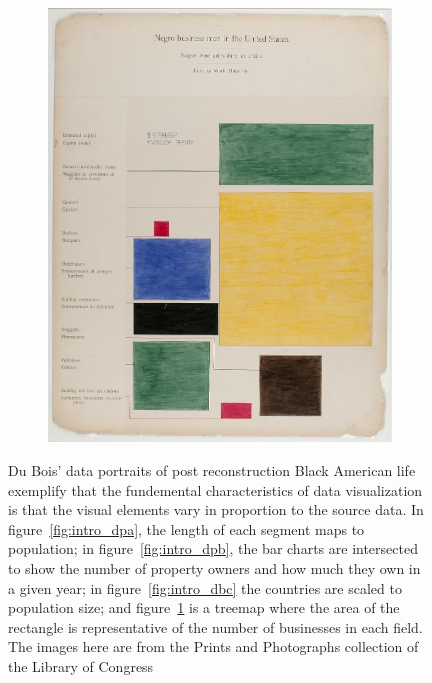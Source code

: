 \documentclass[../main.tex]{subfiles}
\begin{document}
\begin{figure}[H]
\begin{subfigure}{.24\textwidth}
        \includegraphics[width=1\textwidth]{figures/intro/du_bois_heat.png}
        \caption{}
        \label{fig:intro_dbd}
    \end{subfigure}
    \caption{Du Bois' data portraits\cite{duboiscenterattheuniversityofmassachusettsBoisDataPortraits2018} of post reconstruction Black American life exemplify that the fundemental characteristics of data visualization is that the visual elements vary in proportion to the source data. In figure~\ref{fig:intro_dpa}, the length of each segment maps to population; in figure~\ref{fig:intro_dpb}, the bar charts are intersected to show the number of property owners and how much they own in a given year; in figure~\ref{fig:intro_dbc} the countries are scaled to population size; and figure~\ref{fig:intro_dbd} is a treemap where the area of the rectangle is representative of the number of businesses in each field. The images here are from the Prints and Photographs collection of the Library of Congress \cite{duboisGeorgiaNegroCity1900,duboisGeorgiaNegroNegro1900, duboisSeriesStatisticalCharts, duboisSeriesStatisticalChartsa}}
    \label{fig:intro_dubois}
\end{figure}
\end{document}
